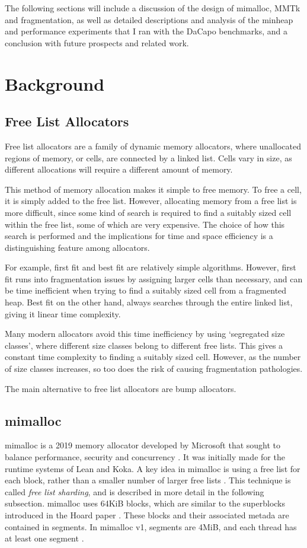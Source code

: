 \documentclass{article}
\begin{document}
The following sections will include a discussion of the design of mimalloc, MMTk and fragmentation, as well as detailed descriptions and analysis of the minheap and performance experiments that I ran with the DaCapo benchmarks, and a conclusion with future prospects and related work.

\section{Background}
\subsection{Free List Allocators}
Free list allocators are a family of dynamic memory allocators, where unallocated regions of memory, or cells, are connected by a linked list. Cells vary in size, as different allocations will require a different amount of memory.

This method of memory allocation makes it simple to free memory. To free a cell, it is simply added to the free list. However, allocating memory from a free list is more difficult, since some kind of search is required to find a suitably sized cell within the free list, some of which are very expensive. The choice of how this search is performed and the implications for time and space efficiency is a distinguishing feature among allocators.

For example, first fit and best fit are relatively simple algorithms. However, first fit runs into fragmentation issues by assigning larger cells than necessary, and can be time inefficient when trying to find a suitably sized cell from a fragmented heap. Best fit on the other hand, always searches through the entire linked list, giving it linear time complexity.

Many modern allocators avoid this time inefficiency by using `segregated size classes', where different size classes belong to different free lists. This gives a constant time complexity to finding a suitably sized cell. However, as the number of size classes increases, so too does the risk of causing fragmentation pathologies.

The main alternative to free list allocators are bump allocators.

\subsection{mimalloc}
mimalloc is a 2019 memory allocator developed by Microsoft that sought to balance performance, security and concurrency \cite{leijen2019mimalloc}. It was initially made for the runtime systems of Lean and Koka. A key idea in mimalloc is using a free list for each block, rather than a smaller number of larger free lists \cite{leijen2019mimalloc}. This technique is called \emph{free list sharding}, and is described in more detail in the following subsection. mimalloc uses 64KiB blocks, which are similar to the superblocks introduced in the Hoard paper \cite{berger2000hoard,leijen2019mimalloc}. These blocks and their associated metada are contained in segments. In mimalloc v1, segments are 4MiB, and each thread has at least one segment \cite{leijen2019mimalloc}.
\end{document}
